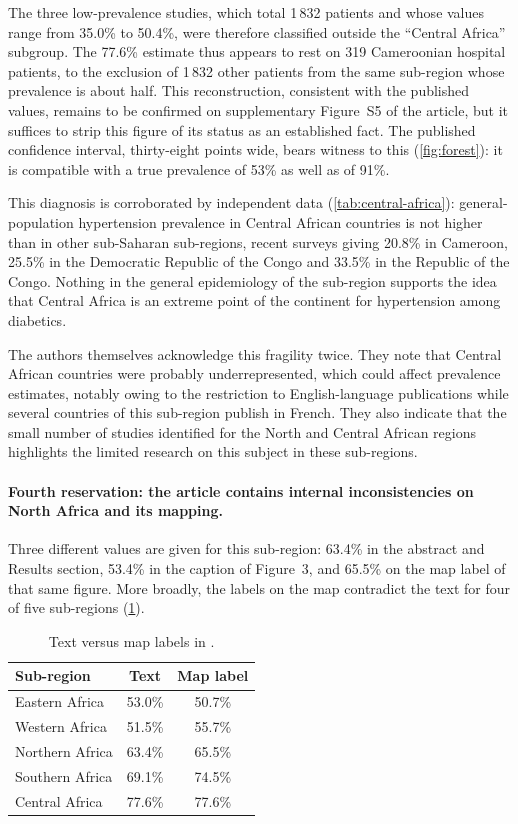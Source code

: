 \documentclass[12pt,a4paper,oneside]{report}
\begin{document}
The three low-prevalence studies, which total 1\,832 patients and whose values range from 35.0\% to 50.4\%, were therefore classified outside the ``Central Africa'' subgroup. The 77.6\% estimate thus appears to rest on 319 Cameroonian hospital patients, to the exclusion of 1\,832 other patients from the same sub-region whose prevalence is about half. This reconstruction, consistent with the published values, remains to be confirmed on supplementary Figure~S5 of the article, but it suffices to strip this figure of its status as an established fact. The published confidence interval, thirty-eight points wide, bears witness to this (\cref{fig:forest}): it is compatible with a true prevalence of 53\% as well as of 91\%.

This diagnosis is corroborated by independent data (\cref{tab:central-africa}): general-population hypertension prevalence in Central African countries is not higher than in other sub-Saharan sub-regions, recent surveys giving 20.8\% in Cameroon, 25.5\% in the Democratic Republic of the Congo and 33.5\% in the Republic of the Congo. Nothing in the general epidemiology of the sub-region supports the idea that Central Africa is an extreme point of the continent for hypertension among diabetics.

The authors themselves acknowledge this fragility twice. They note that Central African countries were probably underrepresented, which could affect prevalence estimates, notably owing to the restriction to English-language publications while several countries of this sub-region publish in French. They also indicate that the small number of studies identified for the North and Central African regions highlights the limited research on this subject in these sub-regions.

\paragraph{Fourth reservation: the article contains internal inconsistencies on North Africa and its mapping.} Three different values are given for this sub-region: 63.4\% in the abstract and Results section, 53.4\% in the caption of Figure~3, and 65.5\% on the map label of that same figure. More broadly, the labels on the map contradict the text for four of five sub-regions (\cref{tab:map}).

\begin{table}[htbp]
\centering\small
\caption{Text versus map labels in \textcite{hinneh2023}.}\label{tab:map}
\begin{tabular}{@{}lcc@{}}
\toprule
\textbf{Sub-region} & \textbf{Text} & \textbf{Map label} \\
\midrule
Eastern Africa & 53.0\% & 50.7\% \\
Western Africa & 51.5\% & 55.7\% \\
Northern Africa & 63.4\% & 65.5\% \\
Southern Africa & 69.1\% & 74.5\% \\
Central Africa & 77.6\% & 77.6\% \\
\bottomrule
\end{tabular}
\end{table}
\end{document}
